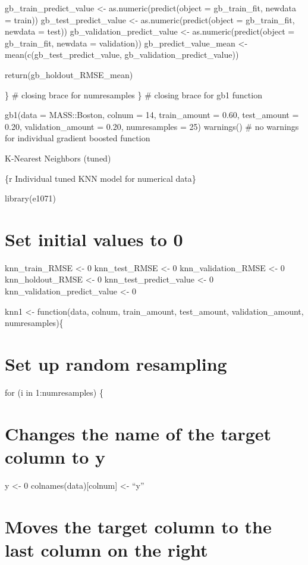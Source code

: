 \documentclass[
]{book}
\begin{document}
gb\_train\_predict\_value \textless- as.numeric(predict(object = gb\_train\_fit,
newdata = train)) gb\_test\_predict\_value \textless- as.numeric(predict(object =
gb\_train\_fit, newdata = test)) gb\_validation\_predict\_value \textless-
as.numeric(predict(object = gb\_train\_fit, newdata = validation))
gb\_predict\_value\_mean \textless- mean(c(gb\_test\_predict\_value,
gb\_validation\_predict\_value))

return(gb\_holdout\_RMSE\_mean)

\} \# closing brace for numresamples \} \# closing brace for gb1 function

gb1(data = MASS::Boston, colnum = 14, train\_amount = 0.60, test\_amount =
0.20, validation\_amount = 0.20, numresamples = 25) warnings() \# no
warnings for individual gradient boosted function

K-Nearest Neighbors (tuned)

\{r Individual tuned KNN model for numerical data\}

library(e1071)

\chapter{Set initial values to 0}\label{set-initial-values-to-0-7}

knn\_train\_RMSE \textless- 0 knn\_test\_RMSE \textless- 0 knn\_validation\_RMSE \textless- 0
knn\_holdout\_RMSE \textless- 0 knn\_test\_predict\_value \textless- 0
knn\_validation\_predict\_value \textless- 0

knn1 \textless- function(data, colnum, train\_amount, test\_amount,
validation\_amount, numresamples)\{

\chapter{Set up random resampling}\label{set-up-random-resampling-6}

for (i in 1:numresamples) \{

\chapter{Changes the name of the target column to y}\label{changes-the-name-of-the-target-column-to-y-6}

y \textless- 0 colnames(data){[}colnum{]} \textless- ``y''

\chapter{Moves the target column to the last column on the right}\label{moves-the-target-column-to-the-last-column-on-the-right-6}
\end{document}
